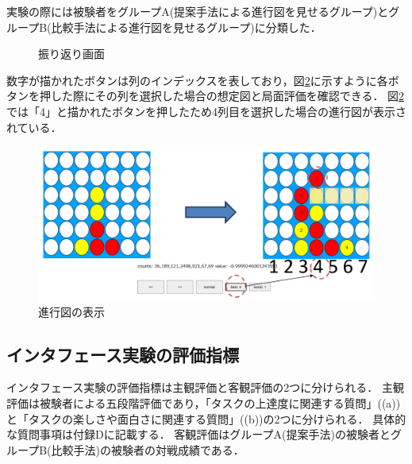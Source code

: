 実験の際には被験者をグループA(提案手法による進行図を見せるグループ)とグループB(比較手法による進行図を見せるグループ)に分類した．
\begin{figure}[htbp]
	\centering
    \setlength{\fboxsep}{1pt} %
    \setlength{\fboxrule}{1pt} %
	\caption{振り返り画面}
	\label{fig:lookBack}
\end{figure}
数字が描かれたボタンは列のインデックスを表しており，図\ref{fig:trajSystem}に示すように各ボタンを押した際にその列を選択した場合の想定図と局面評価を確認できる．
図\ref{fig:trajSystem}では「4」と描かれたボタンを押したため4列目を選択した場合の進行図が表示されている．
\begin{figure}[htbp]
    \centering
    \includegraphics[width=\linewidth]{./figure/4-traj.png}
	\caption{進行図の表示}
	\label{fig:trajSystem}
\end{figure}
\subsection{インタフェース実験の評価指標}
インタフェース実験の評価指標は主観評価と客観評価の2つに分けられる．
主観評価は被験者による五段階評価であり，「タスクの上達度に関連する質問」((a))と「タスクの楽しさや面白さに関連する質問」((b))の2つに分けられる．
具体的な質問事項は付録Dに記載する．
客観評価はグループA(提案手法)の被験者とグループB(比較手法)の被験者の対戦成績である．

